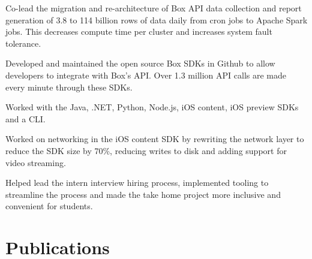 \documentclass[]{plushcv}
\begin{document}
\begin{minipage}[t]{0.74\textwidth}
\begin{tightemize}
\sectionsep
\item Co-lead the migration and re-architecture of Box API data collection and report generation of 3.8 to 114 billion rows of data daily from cron jobs to Apache Spark jobs. This decreases compute time per cluster and increases system fault tolerance.
\item Developed and maintained the open source Box SDKs in Github to allow developers to integrate with Box's API. Over 1.3 million API calls are made every minute through these SDKs.
\item Worked with the Java, .NET, Python, Node.js, iOS content, iOS preview SDKs and a CLI.
\item Worked on networking in the iOS content SDK by rewriting the network layer to reduce the SDK size by 70\%, reducing writes to disk and adding support for video streaming.
\item Helped lead the intern interview hiring process, implemented tooling to streamline the process and made the take home project more inclusive and convenient for students.
\end{tightemize}

\section{Publications}
\\
\sectionsep
{}
\\



\end{minipage}
\end{document}
